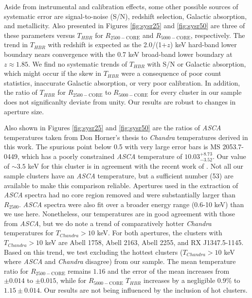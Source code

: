 \documentclass[apj]{emulateapj}
\begin{document}
Aside from instrumental and calibration effects, some other possible
sources of systematic error are signal-to-noise (S/N), redshift
selection, Galactic absorption, and metallicity. Also presented in
Figures \ref{fig:sysr25} and \ref{fig:sysr50} are three of these
parameters versus $T_{HBR}$ for $R_{2500-\mathrm{CORE}}$ and
$R_{5000-\mathrm{CORE}}$, respectively. The trend in $T_{HBR}$ with
redshift is expected as the 2.0/(1+$z$) keV hard-band lower boundary
nears convergence with the 0.7 keV broad-band lower boundary at $z
\approx 1.85$. We find no systematic trends of $T_{HBR}$ with S/N or
Galactic absorption, which might occur if the skew in $T_{HBR}$ were a
consequence of poor count statistics, inaccurate Galactic absorption,
or very poor calibration. In addition, the ratio of $T_{HBR}$ for
$R_{2500-\mathrm{CORE}}$ to $R_{5000-\mathrm{CORE}}$ for every cluster
in our sample does not significanlty deviate from unity. Our results
are robust to changes in aperture size.

Also shown in Figures \ref{fig:sysr25} and \ref{fig:sysr50} are the
ratios of {\it ASCA} temperatures taken from Don Horner's thesis to
{\it Chandra} temperatures derived in this work. The spurious point
below 0.5 with very large error bars is MS 2053.7-0449, which has a
poorly constrained {\it ASCA} temperature of
$10.03^{+8.73}_{-3.52}$. Our value of $\sim 3.5$ keV for this cluster
is in agreement with the recent work of
\cite{2007astro.ph..3156M}. Not all our sample clusters have an {\it
ASCA} temperature, but a sufficient number (53) are available to make
this comparison reliable. Apertures used in the extraction of {\it
ASCA} spectra had no core region removed and were substantially larger
than $R_{2500}$. {\it ASCA} spectra were also fit over a broader
energy range (0.6-10 keV) than we use here. Nonetheless, our
temperatures are in good agreement with those from {\it ASCA}, but we
do note a trend of comparatively hotter {\it Chandra} temperatures for
$T_{Chandra} > 10$ keV. For both apertures, the clusters with
$T_{Chandra} > 10$ keV are Abell 1758, Abell 2163, Abell 2255, and RX
J1347.5-1145. Based on this trend, we test excluding the hottest
clusters ($T_{Chandra} > 10$ keV where {\it ASCA} and {\it Chandra}
disagree) from our sample. The mean temperature ratio for
$R_{2500-\mathrm{CORE}}$ remains $1.16$ and the error of the mean
increases from $\pm 0.014$ to $\pm 0.015$, while for
$R_{5000-\mathrm{CORE}}$ $T_{HBR}$ increases by a negligible $0.9\%$
to $1.15\pm 0.014$. Our results are not being influenced by the
inclusion of hot clusters.
\end{document}
